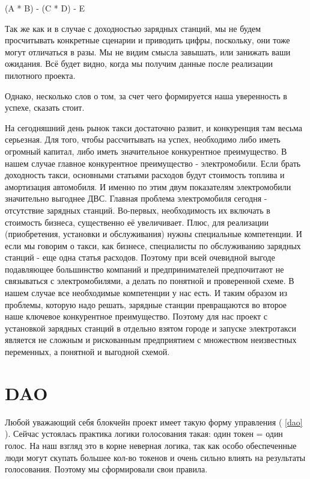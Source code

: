 \documentclass[a4paper,12pt]{report}
\begin{document}
(A * B) - (C * D) - E

Так же как и в случае с доходностью зарядных станций, мы не будем просчитывать конкретные сценарии и приводить цифры, поскольку, они тоже могут отличаться в разы. 
Мы не видим смысла завышать, или занижать ваши ожидания. Всё будет видно, когда мы получим данные после реализации пилотного проекта.

Однако, несколько слов о том, за счет чего формируется наша уверенность в успехе, сказать стоит. 

На сегодняшний день рынок такси достаточно развит, и конкуренция там весьма серьезная. Для того, чтобы рассчитывать на успех, необходимо либо иметь огромный капитал, либо иметь значительное конкурентное преимущество. В нашем случае главное конкурентное преимущество - электромобили.
Если брать доходность такси, основными статьями расходов будут стоимость топлива и амортизация автомобиля. И именно по этим двум показателям электромобили значительно выгоднее ДВС.
Главная проблема электромобиля сегодня - отсутствие зарядных станций. Во-первых, необходимость их включать в стоимость бизнеса, существенно её увеличивает. Плюс, для реализации (приобретения, установки и обслуживания) нужны специальные компетенции. И если мы говорим о такси, как бизнесе, специалисты по обслуживанию зарядных станций - еще одна статья расходов.
Поэтому при всей очевидной выгоде подавляющее большинство компаний и предпринимателей предпочитают не связываться с электромобилями, а делать по понятной и проверенной схеме. 
В нашем случае все необходимые компетенции у нас есть. И таким образом из проблемы, которую надо решать, зарядные станции превращаются во второе наше ключевое конкурентное преимущество. 
Поэтому для нас проект с установкой зарядных станций в отдельно взятом городе и запуске электротакси является не сложным и рискованным предприятием с множеством неизвестных переменных, а понятной и выгодной схемой.


\chapter{DAO}

Любой уважающий себя блокчейн проект имеет такую форму управления ( \ref{dao} ). Сейчас устоялась практика логики голосования такая: один токен = один голос. На наш взгляд это в корне неверная логика, так как особо обеспеченные люди могут скупать большее кол-во токенов и очень сильно влиять на результаты голосования. Поэтому мы сформировали свои правила.
\end{document}
